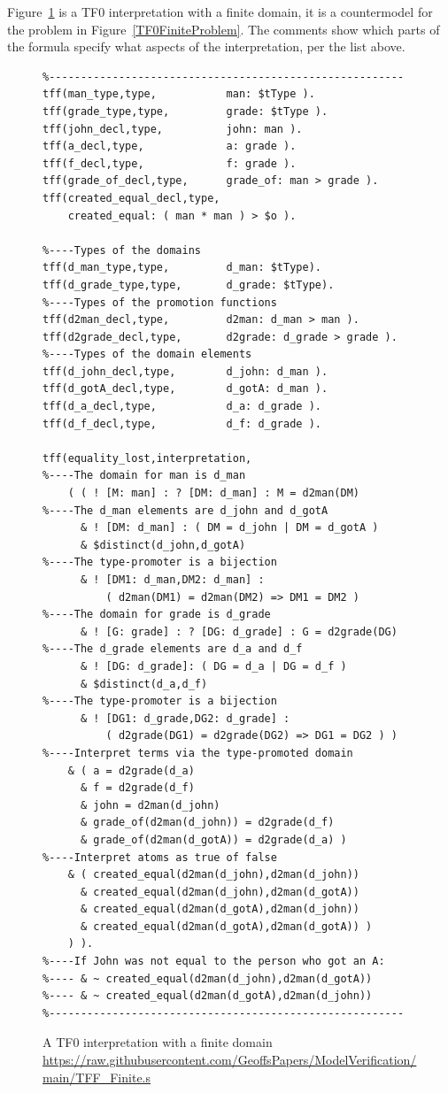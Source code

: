 \documentclass[letterpaper]{article}
\begin{document}
Figure~\ref{TF0FiniteInterpretation} is a TF0 interpretation with a finite domain, it is a 
countermodel for the problem in Figure~\ref{TF0FiniteProblem}.
The comments show which parts of the formula specify what aspects of the interpretation, per
the list above.

\begin{figure}[t!]
\scriptsize
{}
\begin{verbatim}
%--------------------------------------------------------
tff(man_type,type,           man: $tType ).
tff(grade_type,type,         grade: $tType ).
tff(john_decl,type,          john: man ).
tff(a_decl,type,             a: grade ).
tff(f_decl,type,             f: grade ).
tff(grade_of_decl,type,      grade_of: man > grade ).
tff(created_equal_decl,type, 
    created_equal: ( man * man ) > $o ).

%----Types of the domains
tff(d_man_type,type,         d_man: $tType).
tff(d_grade_type,type,       d_grade: $tType).
%----Types of the promotion functions
tff(d2man_decl,type,         d2man: d_man > man ).
tff(d2grade_decl,type,       d2grade: d_grade > grade ).
%----Types of the domain elements
tff(d_john_decl,type,        d_john: d_man ).
tff(d_gotA_decl,type,        d_gotA: d_man ).
tff(d_a_decl,type,           d_a: d_grade ).
tff(d_f_decl,type,           d_f: d_grade ).

tff(equality_lost,interpretation,
%----The domain for man is d_man
    ( ( ! [M: man] : ? [DM: d_man] : M = d2man(DM)
%----The d_man elements are d_john and d_gotA
      & ! [DM: d_man] : ( DM = d_john | DM = d_gotA )
      & $distinct(d_john,d_gotA)
%----The type-promoter is a bijection
      & ! [DM1: d_man,DM2: d_man] :
          ( d2man(DM1) = d2man(DM2) => DM1 = DM2 )
%----The domain for grade is d_grade
      & ! [G: grade] : ? [DG: d_grade] : G = d2grade(DG)
%----The d_grade elements are d_a and d_f
      & ! [DG: d_grade]: ( DG = d_a | DG = d_f )
      & $distinct(d_a,d_f)
%----The type-promoter is a bijection
      & ! [DG1: d_grade,DG2: d_grade] :
          ( d2grade(DG1) = d2grade(DG2) => DG1 = DG2 ) )
%----Interpret terms via the type-promoted domain
    & ( a = d2grade(d_a)
      & f = d2grade(d_f)
      & john = d2man(d_john)
      & grade_of(d2man(d_john)) = d2grade(d_f)
      & grade_of(d2man(d_gotA)) = d2grade(d_a) )
%----Interpret atoms as true of false
    & ( created_equal(d2man(d_john),d2man(d_john))
      & created_equal(d2man(d_john),d2man(d_gotA))
      & created_equal(d2man(d_gotA),d2man(d_john))
      & created_equal(d2man(d_gotA),d2man(d_gotA)) ) 
    ) ).
%----If John was not equal to the person who got an A:
%---- & ~ created_equal(d2man(d_john),d2man(d_gotA))
%---- & ~ created_equal(d2man(d_gotA),d2man(d_john))
%--------------------------------------------------------
\end{verbatim}
\caption{A TF0 interpretation with a finite domain \\
{\scriptsize \url{https://raw.githubusercontent.com/GeoffsPapers/ModelVerification/main/TFF_Finite.s}}}
\label{TF0FiniteInterpretation}
\end{figure}
\end{document}
